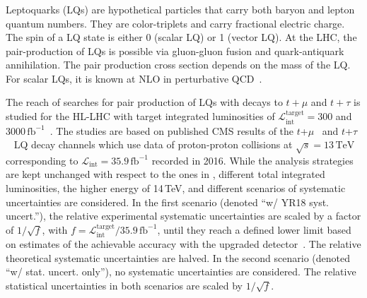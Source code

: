 \subsubsection{}

Leptoquarks (LQs) are hypothetical particles that carry both baryon and lepton quantum numbers. They are color-triplets and carry fractional electric charge. The spin of a LQ state is either 0 (scalar LQ) or 1 (vector LQ). At the LHC, the pair-production of LQs is possible via gluon-gluon fusion and quark-antiquark annihilation. The pair production cross section depends on the mass of the LQ. For scalar LQs, it is known at NLO in perturbative QCD~\cite{Kramer:2004df}.

The reach of searches for pair production of LQs with decays to $t+\mu$ and $t+\tau$ is studied for the HL-LHC with target integrated luminosities of 
$\mathcal{L}_{\text{int}}^{\text{target}} = 300$ and $3000\,\mathrm{fb}^{-1}$~\cite{CMS-PAS-FTR-18-008}. The studies are based on published CMS results of the $t$+$\mu$~\cite{Sirunyan:2018ruf} and $t$+$\tau$~\cite{Sirunyan:2018nkj} LQ decay channels which use data of proton-proton collisions at $\sqrt{s}=13\,\mathrm{TeV}$ corresponding to $\mathcal{L}_{\text{int}} = 35.9\,\mathrm{fb}^{-1}$ recorded in 2016. While the analysis strategies are kept unchanged with respect to the ones in , different total integrated luminosities, the higher \com energy of 14\,TeV, and different scenarios of systematic uncertainties are considered. In the first scenario (denoted ``w/ YR18 syst. uncert.''), the relative experimental systematic uncertainties are scaled by a factor of $1 / \sqrt{f}$, with 
$f=\mathcal{L}_{\text{int}}^{\text{target}}/35.9\,\mathrm{fb}^{-1}$, 
until they reach a defined lower limit based on estimates of the achievable accuracy with the upgraded detector~\cite{CMS:FTR-18-012}. The relative theoretical systematic uncertainties are halved. In the second scenario (denoted ``w/ stat. uncert. only''), no systematic uncertainties are considered. The relative statistical uncertainties in both scenarios are scaled by $1 / \sqrt{f}$.

